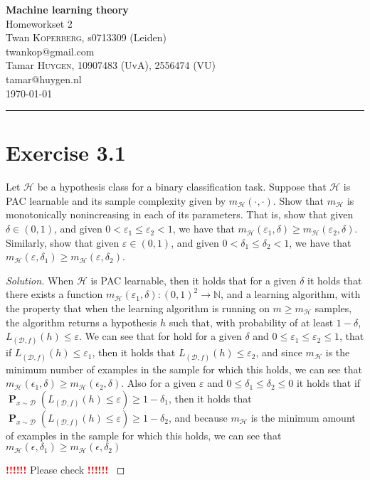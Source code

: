 \documentclass[10pt, a4paper, twoside]{amsart}
\makeatletter
\newcommand{\N}{\ensuremath{\mathbb{N}}}
\renewcommand{\P}{\operatorname*{\ensuremath{\mathbf{P}}}} %
\newenvironment{solution}
               {\let\oldqedsymbol=\qedsymbol
                \renewcommand{\qedsymbol}{$\blacktriangleleft$}
                \begin{proof}[Solution]}
               {\end{proof}
                \renewcommand{\qedsymbol}{\oldqedsymbol}}
\newcommand{\TODO}{\textcolor{red}{\textbf{!!!!!! }}}
\newcommand{\firstName}  {Twan}
\newcommand{\lastName}   {Koperberg}
\newcommand{\studId}     {0713309 (Leiden)}
\renewcommand{\email}    {twankop@gmail.com}
\newcommand{\firstNameII}  {Tamar}
\newcommand{\lastNameII}   {Huygen}
\newcommand{\studIdII}     {10907483 (UvA)}
\newcommand{\studIdIII}    {2556474 (VU)}
\newcommand{\emailII}     {tamar@huygen.nl}
\makeatother
\begin{document}
\begin{center}

  {\huge\bf Machine learning theory}\\
  {\large\sc Homeworkset 2 }\\ \vspace{1em}
  \firstName \textsc{ \lastName}, {\sc s}\studId \\
  \email\text{}\\ \smallskip
  \firstNameII \textsc{ \lastNameII}, \studIdII, \studIdIII\\
  \emailII \\ \bigskip
  \today \\\bigskip
  \hrule
  \bigskip
\end{center}


\section*{Exercise 3.1} 
Let $\mathcal{H}$ be a hypothesis class for a binary classification task. Suppose that $\mathcal{H}$ is PAC learnable and its sample complexity given by $m_{\mathcal{H}}(\cdot,\cdot)$.
Show that $m_{\mathcal{H}}$ is monotonically nonincreasing in each of its parameters. That is, show that given $\delta \in (0,1)$, and given $0<\varepsilon_1 \leq \varepsilon_2<1$, we have that $m_{\mathcal{H}}(\varepsilon_1, \delta) \geq m_{\mathcal{H}}(\varepsilon_2, \delta)$. Similarly, show that given $\varepsilon \in (0,1)$, and given $0<\delta_1 \leq \delta_2 <1$, we have that $m_{\mathcal{H}}(\varepsilon, \delta_1) \geq m_{\mathcal{H}}(\varepsilon, \delta_2)$.
\begin{solution}
When $\mathcal{H}$ is PAC learnable, then it holds that for a given $\delta$ it holds that there exists a function $m_{\mathcal{H}}(\varepsilon_1,\delta ):(0,1)^2 \rightarrow \N$, and a learning algorithm, with the property that when the learning algorithm is running on $m \geq m_{\mathcal{H}}$ samples, the algorithm returns a hypothesis $h$ such that, with probability of at least $1- \delta$, $L_{(\mathcal{D},f)}(h)\leq \varepsilon$. We can see that for hold for a given $\delta$ and $0 \leq \varepsilon_1 \leq \varepsilon_2 \leq 1$, that if $L_{(\mathcal{D},f)}(h)\leq \varepsilon_1$, then it holds that $L_{(\mathcal{D},f)}(h)\leq \varepsilon_2$, and since $m_{\mathcal{H}}$ is the minimum number of examples in the sample for which this holds, we can see that $m_{\mathcal{H}}(\epsilon_1, \delta) \geq m_{\mathcal{H}}(\epsilon_2, \delta)$. Also for a given $\varepsilon$ and $0\leq \delta_1 \leq \delta_2 \leq 0$ it holds that if $\P_{x\sim \mathcal{D}}(L_{(\mathcal{D},f)}(h)\leq \varepsilon) \geq 1-\delta_1$, then it holds that $\P_{x\sim \mathcal{D}}(L_{(\mathcal{D},f)}(h)\leq \varepsilon) \geq 1-\delta_2$, and because $m_{\mathcal{H}}$ is the minimum amount of examples in the sample for which this holds, we can see that $m_{\mathcal{H}}(\epsilon, \delta_1) \geq m_{\mathcal{H}}(\epsilon, \delta_2)$

\TODO Please check \TODO
\end{solution}
\end{document}
